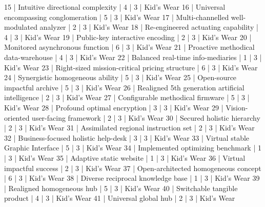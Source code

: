 \begin{enumerate}
\begin{pseudo*}
      15 | Intuitive directional complexity                 |        4 |      3 | Kid's Wear    
      16 | Universal encompassing conglomeration            |        5 |      3 | Kid's Wear    
      17 | Multi-channelled well-modulated analyzer         |        2 |      3 | Kid's Wear    
      18 | Re-engineered actuating capability               |        4 |      3 | Kid's Wear    
      19 | Public-key interactive encoding                  |        2 |      3 | Kid's Wear    
      20 | Monitored asynchronous function                  |        6 |      3 | Kid's Wear    
      21 | Proactive methodical data-warehouse              |        4 |      3 | Kid's Wear    
      22 | Balanced real-time info-mediaries                |        1 |      3 | Kid's Wear    
      23 | Right-sized mission-critical pricing structure   |        6 |      3 | Kid's Wear    
      24 | Synergistic homogeneous ability                  |        5 |      3 | Kid's Wear    
      25 | Open-source impactful archive                    |        5 |      3 | Kid's Wear    
      26 | Realigned 5th generation artificial intelligence |        2 |      3 | Kid's Wear    
      27 | Configurable methodical firmware                 |        5 |      3 | Kid's Wear    
      28 | Profound optimal encryption                      |        3 |      3 | Kid's Wear    
      29 | Vision-oriented user-facing framework            |        2 |      3 | Kid's Wear    
      30 | Secured holistic hierarchy                       |        2 |      3 | Kid's Wear    
      31 | Assimilated regional instruction set             |        2 |      3 | Kid's Wear    
      32 | Business-focused holistic help-desk              |        3 |      3 | Kid's Wear    
      33 | Virtual stable Graphic Interface                 |        5 |      3 | Kid's Wear    
      34 | Implemented optimizing benchmark                 |        1 |      3 | Kid's Wear    
      35 | Adaptive static website                          |        1 |      3 | Kid's Wear    
      36 | Virtual impactful success                        |        2 |      3 | Kid's Wear    
      37 | Open-architected homogeneous concept             |        6 |      3 | Kid's Wear    
      38 | Diverse reciprocal knowledge base                |        1 |      3 | Kid's Wear    
      39 | Realigned homogeneous hub                        |        5 |      3 | Kid's Wear    
      40 | Switchable tangible product                      |        4 |      3 | Kid's Wear    
      41 | Universal global hub                             |        2 |      3 | Kid's Wear    

\end{pseudo*}
\end{enumerate}
